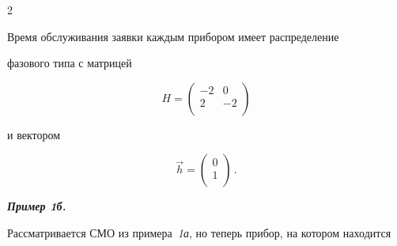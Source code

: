 \begin{multicols}{2}
























Время обслуживания заявки каждым прибором имеет распределение


фазового типа с мат\-ри\-цей


$$


H=


\begin{pmatrix}


-2 & 0\\


2 & -2\\


\end{pmatrix}


$$


и вектором


$$


\vec h =


\begin{pmatrix}


0\\


1\\


\end{pmatrix}\,.


$$











{\bfseries\textit{Пример 1б.}}


Рассматривается СМО из примера~\textit{1а}, но теперь прибор, на котором находится



\end{multicols}
